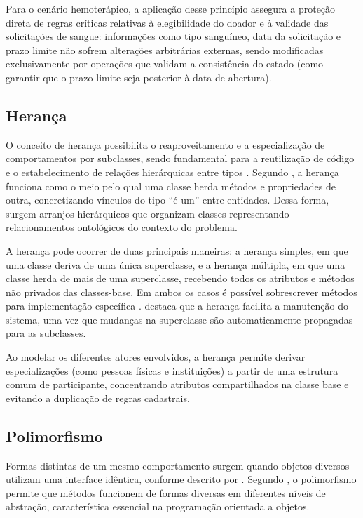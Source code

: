 Para o cenário hemoterápico, a aplicação desse princípio assegura a proteção direta de regras críticas relativas à elegibilidade do doador e à validade das solicitações de sangue: informações como tipo sanguíneo, data da solicitação e prazo limite não sofrem alterações arbitrárias externas, sendo modificadas exclusivamente por operações que validam a consistência do estado (como garantir que o prazo limite seja posterior à data de abertura).

\subsection{Herança}

O conceito de herança possibilita o reaproveitamento e a especialização de comportamentos por subclasses, sendo fundamental para a reutilização de código e o estabelecimento de relações hierárquicas entre tipos \cite{sommerville2011}. Segundo , a herança funciona como o meio pelo qual uma classe herda métodos e propriedades de outra, concretizando vínculos do tipo ``é-um'' entre entidades. Dessa forma, surgem arranjos hierárquicos que organizam classes representando relacionamentos ontológicos do contexto do problema.

A herança pode ocorrer de duas principais maneiras: a herança simples, em que uma classe deriva de uma única superclasse, e a herança múltipla, em que uma classe herda de mais de uma superclasse, recebendo todos os atributos e métodos não privados das classes-base. Em ambos os casos é possível sobrescrever métodos para implementação específica \cite{booch2007}.  destaca que a herança facilita a manutenção do sistema, uma vez que mudanças na superclasse são automaticamente propagadas para as subclasses.

Ao modelar os diferentes atores envolvidos, a herança permite derivar especializações (como pessoas físicas e instituições) a partir de uma estrutura comum de participante, concentrando atributos compartilhados na classe base e evitando a duplicação de regras cadastrais.

\subsection{Polimorfismo}

Formas distintas de um mesmo comportamento surgem quando objetos diversos utilizam uma interface idêntica, conforme descrito por . Segundo , o polimorfismo permite que métodos funcionem de formas diversas em diferentes níveis de abstração, característica essencial na programação orientada a objetos.

